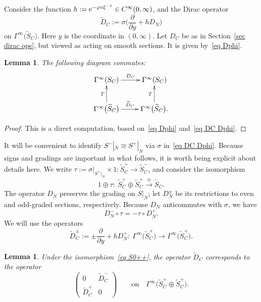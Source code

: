 \documentclass[pdftex]{sigma}%
\numberwithin{equation}{section}
\newtheorem{Lemma}[Theorem]{Lemma}
\begin{document}
Consider the function $h:= {\rm e}^{-\varphi \circ \xi^{-1}} \in C^{\infty}(0, \infty)$, and the Dirac operator
\begin{equation*}%
\widetilde{D}_C := \sigma\bigg( \frac{\partial}{\partial y} + h D_N\bigg)
\end{equation*}
on $\Gamma^{\infty}\big(\widetilde{S}_C\big)$. Here $y$ is the coordinate in $(0, \infty)$. Let $D_C$ be as in Section~\ref{sec dirac ops}, but viewed as acting on smooth sections. It is given by~\eqref{eq Dphi}.
\begin{Lemma}\label{lem T Dpsi}
The following diagram commutes:
\[
\xymatrix{
\Gamma^{\infty}(S_C) \ar[r]^-{D_{C}} & \Gamma^{\infty}(S_C) \\
\Gamma^{\infty}\big(\widetilde{S}_C\big) \ar[u]^-{T} \ar[r]^-{\widetilde{D}_C} & \Gamma^{\infty}\big(\widetilde{S}_C\big) \ar[u]^-{T}.
}
\]
\end{Lemma}
\begin{proof}
This is a direct computation, based on~\eqref{eq Dphi} and~\eqref{eq DC Dphi}.
\end{proof}

It will be convenient to identify $S^-|_N \cong S^+|_N$ via $\sigma$ in~\eqref{eq DC Dphi}. Because signs and gradings are important in what follows, it is worth being explicit about details here.
We write
 $\tau:= \sigma|_{S^+|_N} \times 1\colon \widetilde{S}_C^+ \to \widetilde{S}_C^-$, and consider the isomorphism
\begin{equation} \label{eq S0++}
1 \oplus \tau\colon\
\widetilde{S}_C^+ \oplus \widetilde{S}_C^+ \xrightarrow{\cong}\widetilde{S}_C.
\end{equation}
The operator $D_N$ preserves the grading on $S|_N$; let $D_N^{\pm}$ be its restrictions to even and odd-graded sections, respectively. Because $D_N$ anticommutes with $\sigma$, we have
\begin{equation} \label{eq DN sigma}
D_N^- \circ \tau = -\tau \circ D_N^+.
\end{equation}
We will use the operators
\[
\widetilde{D}_C^{\pm} := \pm \frac{\partial}{\partial y} +hD_N^+\colon\ \Gamma^{\infty}\big(\widetilde{S}_C^+\big) \to \Gamma^{\infty}\big(\widetilde{S}_C^+\big).
\]

\begin{Lemma}\label{lem D0pm}
Under the isomorphism~\eqref{eq S0++}, the operator $\widetilde{D}_C$ corresponds to the operator
\[
\begin{pmatrix}
0 & \widetilde{D}_C^-\\
\widetilde{D}_C^+ & 0
\end{pmatrix}
\qquad \text{on} \quad \Gamma^{\infty}\big(\widetilde{S}_C^+ \oplus \widetilde{S}_C^+\big).
\]
\end{Lemma}
\end{document}
